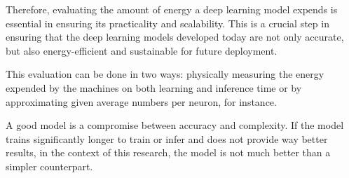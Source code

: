 Therefore, evaluating the amount of energy a deep learning model expends is essential in ensuring its practicality and scalability. This is a crucial step in ensuring that the deep learning models developed today are not only accurate, but also energy-efficient and sustainable for future deployment.

This evaluation can be done in two ways: physically measuring the energy expended by the machines on both learning and inference time or by approximating given average numbers per neuron, for instance.

A good model is a compromise between accuracy and complexity. If the model trains significantly longer to train or infer and does not provide way better results, in the context of this research, the model is not much better than a simpler counterpart.